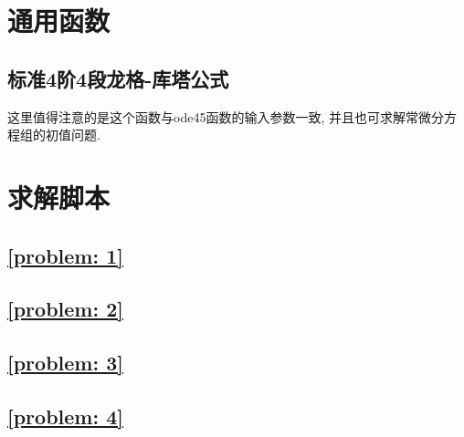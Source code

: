 \documentclass[a4paper, 12pt]{ctexart}
\let\oldlstinputlisting
\renewcommand{}[2][\empty]{
    \par\nolinenumbers\oldlstinputlisting[#1]{#2}\linenumbers\par
}
\theoremstyle{plain}
\theoremstyle{plain}
\theoremstyle{plain}
\theoremstyle{nonumberplain}
\begin{document}
    \newpage
    \appendix

    \section{通用函数}

    \subsection{标准4阶4段龙格-库塔公式}

    这里值得注意的是这个函数与ode45函数的输入参数一致, 并且也可求解常微分方程组的初值问题.

    

    \section{求解脚本}

    \subsection{\ref{problem: 1}}

    

    \subsection{\ref{problem: 2}}

    

    \subsection{\ref{problem: 3}}

    

    \subsection{\ref{problem: 4}}

    
\end{document}
